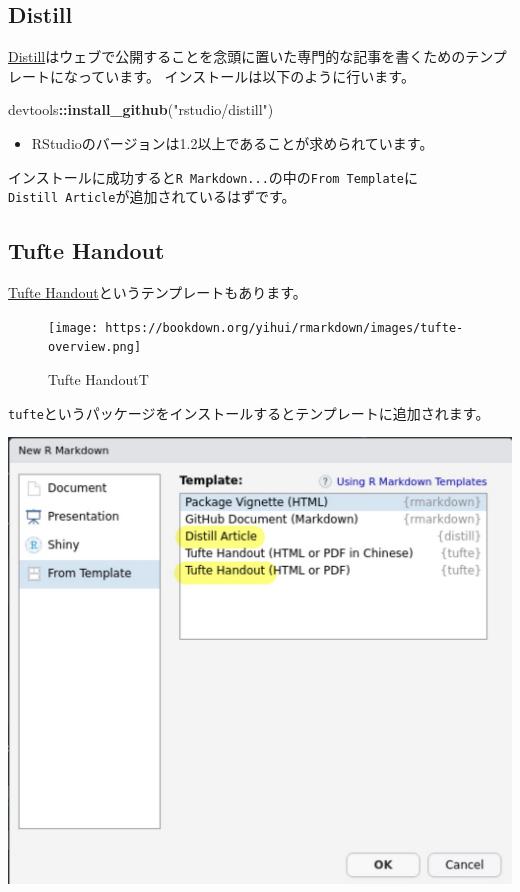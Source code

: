 \documentclass[]{bxjsreport}
\newenvironment{Shaded}{\begin{snugshade}}{\end{snugshade}}
\newcommand{\KeywordTok}[1]{\textcolor[rgb]{0.13,0.29,0.53}{\textbf{#1}}}
\newcommand{\NormalTok}[1]{#1}
\newcommand{\OperatorTok}[1]{\textcolor[rgb]{0.81,0.36,0.00}{\textbf{#1}}}
\newcommand{\StringTok}[1]{\textcolor[rgb]{0.31,0.60,0.02}{#1}}
\providecommand{\tightlist}{%
  \setlength{\itemsep}{0pt}\setlength{\parskip}{0pt}}
\let\asdf\section
\renewcommand{\section}{\chapter}
\let\asdff\subsection
\renewcommand{\subsection}{\asdf}
\renewcommand{\subsubsection}{\asdff}
\begin{document}
\hypertarget{distill}{%
\subsubsection{Distill}\label{distill}}

\href{https://rstudio.github.io/distill/}{Distill}はウェブで公開することを念頭に置いた専門的な記事を書くためのテンプレートになっています。
インストールは以下のように行います。

\begin{Shaded}
\begin{Highlighting}[]
\NormalTok{devtools}\OperatorTok{::}\KeywordTok{install_github}\NormalTok{(}\StringTok{"rstudio/distill"}\NormalTok{)}
\end{Highlighting}
\end{Shaded}

\begin{itemize}
\tightlist
\item
  RStudioのバージョンは1.2以上であることが求められています。
\end{itemize}

インストールに成功すると\texttt{R\ Markdown...}の中の\texttt{From\ Template}に\texttt{Distill\ Article}が追加されているはずです。

\hypertarget{tufte-handout}{%
\subsubsection{Tufte Handout}\label{tufte-handout}}

\href{https://rstudio.github.io/tufte/}{Tufte Handout}というテンプレートもあります。

\begin{figure}
\centering
\texttt{[image: https://bookdown.org/yihui/rmarkdown/images/tufte-overview.png]}
\caption{Tufte HandoutT}
\end{figure}

\texttt{tufte}というパッケージをインストールするとテンプレートに追加されます。

\includegraphics{figures/rmarkdown_html6.jpg}
\end{document}
